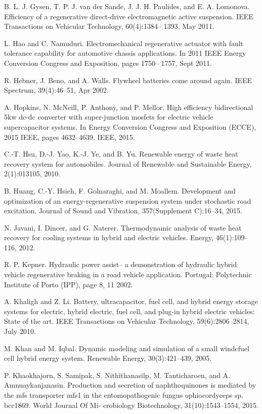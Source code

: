  B. L. J. Gysen, T. P. J. van der Sande, J. J. H. Paulides, and E. A. Lomonova. Efficiency of a regenerative direct-drive electromagnetic active suspension. IEEE Transactions on Vehicular Technology, 60(4):1384-- 1393, May 2011.

 L. Hao and C. Namuduri. Electromechanical regenerative actuator with fault tolerance capability for automotive chassis applications. In 2011 IEEE Energy Conversion Congress and Exposition, pages 1750-- 1757, Sept 2011.

 R. Hebner, J. Beno, and A. Walls. Flywheel batteries come around again. IEEE Spectrum, 39(4):46--51, Apr 2002.

 A. Hopkins, N. McNeill, P. Anthony, and P. Mellor. High efficiency bidirectional 5kw dc-dc converter with super-junction mosfets for electric vehicle supercapacitor systems. In Energy Conversion Congress and Exposition (ECCE), 2015 IEEE, pages 4632--4639. IEEE, 2015.

 C.-T. Hsu, D.-J. Yao, K.-J. Ye, and B. Yu. Renewable energy of waste heat recovery system for automobiles. Journal of Renewable and Sustainable Energy, 2(1):013105, 2010.

 B. Huang, C.-Y. Hsieh, F. Golnaraghi, and M. Moallem. Development and optimization of an energy-regenerative suspension system under stochastic road excitation. Journal of Sound and Vibration, 357(Supplement C):16--34, 2015.

 N. Javani, I. Dincer, and G. Naterer. Thermodynamic analysis of waste heat recovery for cooling systems in hybrid and electric vehicles. Energy, 46(1):109--116, 2012.

 R. P. Kepner. Hydraulic power assist-- a demonstration of hydraulic hybrid vehicle regenerative braking in a road vehicle application. Portugal: Polytechnic Institute of Porto (IPP), page 8, 11 2002.

 A. Khaligh and Z. Li. Battery, ultracapacitor, fuel cell, and hybrid energy storage systems for electric, hybrid electric, fuel cell, and plug-in hybrid electric vehicles: State of the art. IEEE Transactions on Vehicular
Technology, 59(6):2806--2814, July 2010.

 M. Khan and M. Iqbal. Dynamic modeling and simulation of a small windcfuel cell hybrid energy system.
Renewable Energy, 30(3):421--439, 2005.

 P. Khaokhajorn, S. Samipak, S. Nithithanasilp, M. Tanticharoen, and A. Amnuaykanjanasin. Production and secretion of naphthoquinones is mediated by the mfs transporter mfs1 in the entomopathogenic fungus ophiocordyceps sp. bcc1869. World Journal Of Mi-
crobiology Biotechnology, 31(10):1543--1554, 2015. 

